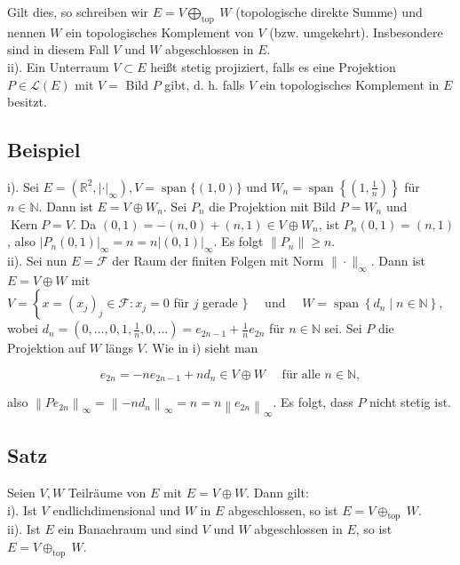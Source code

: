 \documentclass[10pt, letterpaper]{article}
\begin{document}
Gilt dies, so schreiben wir $E=V \bigoplus_{\text {top }} W$ (topologische direkte Summe) und nennen $W$ ein topologisches Komplement von $V$ (bzw. umgekehrt). Insbesondere sind in diesem Fall $V$ und $W$ abgeschlossen in $E$.\\
ii). Ein Unterraum $V \subset E$ heißt stetig projiziert, falls es eine Projektion $P \in \mathcal{L}(E)$ mit $V=$ Bild $P$ gibt, d. h. falls $V$ ein topologisches Komplement in $E$ besitzt.

\subsection*{Beispiel}
i). Sei $E=\left(\mathbb{R}^{2},|\cdot|_{\infty}\right), V=\operatorname{span}\{(1,0)\}$ und $W_{n}=\operatorname{span}\left\{\left(1, \frac{1}{n}\right)\right\}$ für $n \in \mathbb{N}$. Dann ist $E=V \oplus W_{n}$. Sei $P_{n}$ die Projektion mit Bild $P=W_{n}$ und $\operatorname{Kern} P=V$. Da $(0,1)=-(n, 0)+(n, 1) \in V \oplus W_{n}$, ist $P_{n}(0,1)=(n, 1)$, also $\left|P_{n}(0,1)\right|_{\infty}= n=n|(0,1)|_{\infty}$. Es folgt $\left\|P_{n}\right\| \geq n$.\\
ii). Sei nun $E=\mathcal{F}$ der Raum der finiten Folgen mit Norm $\|\cdot\|_{\infty}$. Dann ist $E=V \oplus W$ mit\\
$V=\left\{x=\left(x_{j}\right)_{j} \in \mathcal{F}: x_{j}=0\right.$ für $j$ gerade $\} \quad$ und $\quad W=\operatorname{span}\left\{d_{n} \mid n \in \mathbb{N}\right\}$, wobei $d_{n}=\left(0, \ldots, 0,1, \frac{1}{n}, 0, \ldots\right)=e_{2 n-1}+\frac{1}{n} e_{2 n}$ für $n \in \mathbb{N}$ sei. Sei $P$ die Projektion auf $W$ längs $V$. Wie in i) sieht man

$$
e_{2 n}=-n e_{2 n-1}+n d_{n} \in V \oplus W \quad \text { für alle } n \in \mathbb{N},
$$

also $\left\|P e_{2 n}\right\|_{\infty}=\left\|-n d_{n}\right\|_{\infty}=n=n\left\|e_{2 n}\right\|_{\infty}$. Es folgt, dass $P$ nicht stetig ist.

\subsection*{Satz}
Seien $V, W$ Teilräume von $E$ mit $E=V \oplus W$. Dann gilt:\\
i). Ist $V$ endlichdimensional und $W$ in $E$ abgeschlossen, so ist $E=V \oplus_{\text {top }} W$.\\
ii). Ist $E$ ein Banachraum und sind $V$ und $W$ abgeschlossen in $E$, so ist $E= V \oplus_{\text {top }} W$.
\end{document}
